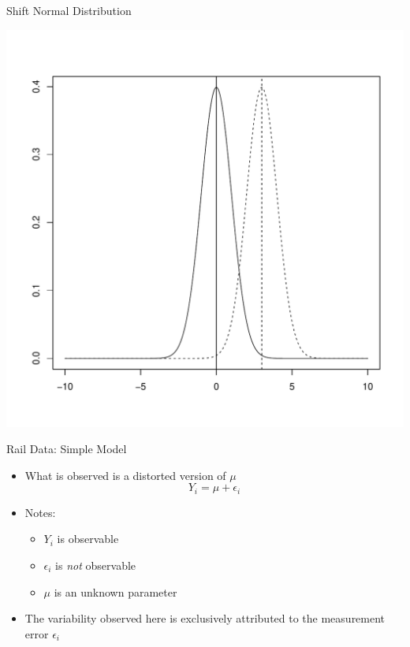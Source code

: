 \documentclass[xcolor=x11names,compress]{beamer}\usepackage[]{graphicx}\usepackage[]{color}
\newenvironment{knitrout}{}{} %
\begin{document}
\begin{frame}{Shift Normal Distribution}
\begin{knitrout}\tiny
{}\color{fgcolor}

{\centering \includegraphics[width=.6\linewidth]{figure/beamer-unnamed-chunk-27-1} 

}



\end{knitrout}
\end{frame}


\begin{frame}{Rail Data: Simple Model}
  \begin{itemize}
  \item What is observed is a distorted version of $\mu$
    \begin{equation*}
      Y_{i}=\mu+\epsilon_i
    \end{equation*}
    \item Notes:
    \begin{itemize}
    \item  $Y_i$ is observable
    \item  $\epsilon_i$ is {\it not} observable
    \item $\mu$ is an unknown parameter
    \end{itemize}
 \item The variability observed here is exclusively attributed to the measurement error
      $\epsilon_i$
  \end{itemize}
\end{frame}
\end{document}
